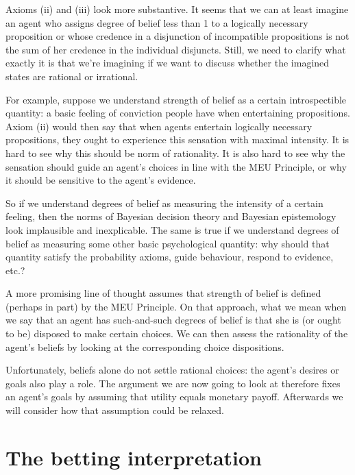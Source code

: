 Axioms (ii) and (iii) look more substantive. It seems that we can at
least imagine an agent who assigns degree of belief less than 1 to a
logically necessary proposition or whose credence in a disjunction of
incompatible propositions is not the sum of her credence in the
individual disjuncts. Still, we need to clarify what exactly it is
that we're imagining if we want to discuss whether the imagined states
are rational or irrational.

For example, suppose we understand strength of belief as a certain
introspectible quantity: a basic feeling of conviction people have
when entertaining propositions. Axiom (ii) would then say that when
agents entertain logically necessary propositions, they ought to
experience this sensation with maximal intensity. It is hard to see
why this should be norm of rationality. It is also hard to see why
the sensation should guide an agent's choices in line with the MEU
Principle, or why it should be sensitive to the agent's evidence.

So if we understand degrees of belief as measuring the intensity of a
certain feeling, then the norms of Bayesian decision theory and Bayesian
epistemology look implausible and inexplicable. The same is true if we
understand degrees of belief as measuring some other basic
psychological quantity: why should that quantity satisfy the
probability axioms, guide behaviour, respond to evidence, etc.?

A more promising line of thought assumes that strength of belief is
defined (perhaps in part) by the MEU Principle. On that approach, what
we mean when we say that an agent has such-and-such degrees of belief
is that she is (or ought to be) disposed to make certain choices. We
can then assess the rationality of the agent's beliefs by looking at
the corresponding choice dispositions.

Unfortunately, beliefs alone do not settle rational choices: the
agent's desires or goals also play a role. The argument we are now
going to look at therefore fixes an agent's goals by assuming that
utility equals monetary payoff. Afterwards we will consider how that
assumption could be relaxed.


\section{The betting interpretation}

